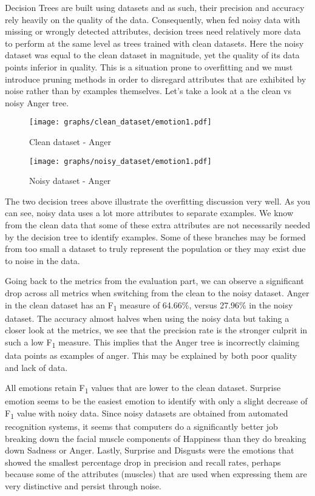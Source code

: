 Decision Trees are built using datasets and as such, their precision and accuracy rely heavily on the quality of the data.
Consequently, when fed noisy data with missing or wrongly detected attributes, decision trees need relatively more data to
perform at the same level as trees trained with clean datasets. Here the noisy dataset was equal to the clean dataset in magnitude, yet the quality of its data points
inferior in quality. This is a situation prone to overfitting and we must introduce pruning methods in order to disregard attributes
that are exhibited by noise rather than by examples themselves. Let's take a look at a the clean vs noisy Anger tree.

\begin{figure}[!ht]
\center
	\caption{Clean dataset - Anger}  
	\texttt{[image: graphs/clean\_dataset/emotion1.pdf]}
   \label{fig:cleandecisionTree1}
\end{figure}

\begin{figure}[!ht]
\center
	\caption{Noisy dataset - Anger}  
	\texttt{[image: graphs/noisy\_dataset/emotion1.pdf]}
   \label{fig:cleandecisionTree1}
\end{figure}

The two decision trees above illustrate the overfitting discussion very well.
As you can see, noisy data uses a lot more attributes to separate examples.
We know from the clean data that some of these extra attributes are not necessarily needed by the decision tree to identify examples.
Some of these branches may be formed from too small a dataset to truly represent the population or they may exist due to noise in the data.

Going back to the metrics from the evaluation part,
we can observe a significant drop across all metrics when switching from the clean to the noisy dataset.
Anger in the clean dataset has an F\textsubscript{1} measure of 64.66\%, versus 27.96\% in the noisy dataset.
The accuracy almost halves when using the noisy data but taking a closer look at the metrics, we see that the precision
rate is the stronger culprit in such a low F\textsubscript{1} measure. This implies that the Anger tree is incorrectly claiming
data points as examples of anger. This may be explained by both poor quality and lack of data.

All emotions retain F\textsubscript{1} values that are lower to the clean dataset. 
Surprise emotion seems to be the easiest emotion to identify with only a slight decrease of F\textsubscript{1} value with noisy data.
Since noisy datasets are obtained from automated recognition systems, it seems that computers do a significantly better job
breaking down the facial muscle components of Happiness than they do breaking down Sadness or Anger. 
Lastly, Surprise and Disgusts were the emotions that showed the smallest percentage drop in precision and recall rates, perhaps because
some of the attributes (muscles) that are used when expressing them are very distinctive and persist through noise.
